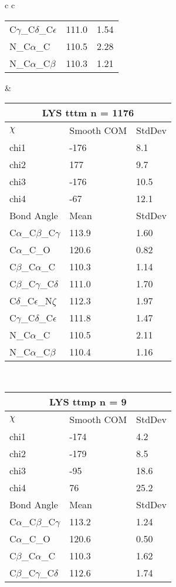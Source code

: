 \begin{longtable}{ c c }
\begin{tabular}{ l l l }
  C$\gamma$\_C$\delta$\_C$\epsilon$ & 111.0 & 1.54\\
  N\_C$\alpha$\_C & 110.5 & 2.28\\
  N\_C$\alpha$\_C$\beta$ & 110.3 & 1.21\\
  \bottomrule
  \end{tabular}
  &
  \begin{tabular}{ l l l }
  \toprule
  \multicolumn{3}{c}{LYS \textbf{tttm} n = 1176} \\ \toprule
  $\chi$       & Smooth COM & StdDev \\ \midrule
  chi1 & -176 & 8.1 \\ 
  chi2 & 177 & 9.7 \\ 
  chi3 & -176 & 10.5 \\ 
  chi4 & -67 & 12.1 \\ \midrule
  Bond Angle   & Mean     & StdDev \\ \midrule
  C$\alpha$\_C$\beta$\_C$\gamma$ & 113.9 & 1.60\\
  C$\alpha$\_C\_O & 120.6 & 0.82\\
  C$\beta$\_C$\alpha$\_C & 110.3 & 1.14\\
  C$\beta$\_C$\gamma$\_C$\delta$ & 111.0 & 1.70\\
  C$\delta$\_C$\epsilon$\_N$\zeta$ & 112.3 & 1.97\\
  C$\gamma$\_C$\delta$\_C$\epsilon$ & 111.8 & 1.47\\
  N\_C$\alpha$\_C & 110.5 & 2.11\\
  N\_C$\alpha$\_C$\beta$ & 110.4 & 1.16\\
  \bottomrule
  \end{tabular}
  \\
  \begin{tabular}{ l l l }
  \toprule
  \multicolumn{3}{c}{LYS \textbf{ttmp} n = 9} \\ \toprule
  $\chi$       & Smooth COM & StdDev \\ \midrule
  chi1 & -174 & 4.2 \\ 
  chi2 & -179 & 8.5 \\ 
  chi3 & -95 & 18.6 \\ 
  chi4 & 76 & 25.2 \\ \midrule
  Bond Angle   & Mean     & StdDev \\ \midrule
  C$\alpha$\_C$\beta$\_C$\gamma$ & 113.2 & 1.24\\
  C$\alpha$\_C\_O & 120.6 & 0.50\\
  C$\beta$\_C$\alpha$\_C & 110.3 & 1.62\\
  C$\beta$\_C$\gamma$\_C$\delta$ & 112.6 & 1.74\\

\end{tabular}
\end{longtable}

